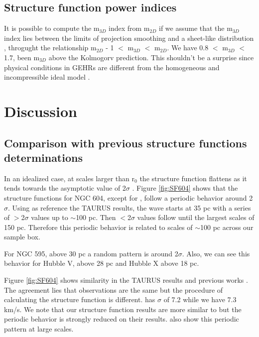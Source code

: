 \documentclass[fleqn,usenatbib]{mnras}
\begin{document}
\subsection{Structure function power indices}

It is possible to compute the m$_{3D}$ index from m$_{2D}$ if we assume that the m$_{3D}$ index lies between the limits of projection smoothing and a sheet-like distribution \citep{arthur2016turbulence}, throgught the relationship  m$_{2D}$ - 1 $<$ m$_{3D}$ $<$ m$_{2D}$. We have 0.8 $<$ m$_{3D}$ $<$ 1.7, been m$_{3D}$ above the Kolmogorv prediction. This shouldn't be a surprise since physical conditions in GEHRs are different from the homogeneous and incompressible ideal model \citep{munch1958internal, castaneda1988,lagrois2011}. 

\clearpage


\section{Discussion}\label{sec:disc}




\subsection{Comparison with previous structure functions determinations}

In an idealized case, at scales larger than r$_{0}$ the structure function flattens as it tends towards the asymptotic value of 2$\sigma$ \citep{arthur2016turbulence}. Figure \ref{fig:SF604} shows that the structure functions for NGC 604, except for \cite{2019arXiv191203543M}, follow a periodic behavior around 2$\sigma$. Using as reference the TAURUS results, the wave starts at 35 pc with a series of $ >$2$\sigma$ values up to $\sim$100 pc. Then $<$2$\sigma$ values follow until the largest scales of 150 pc. Therefore this periodic behavior is related to scales of $\sim$100 pc across our sample box. 

For NGC 595, above 30 pc a random pattern is around 2$\sigma$. Also, we can see this behavior for Hubble V, above 28 pc and Hubble X above 18 pc.

Figure \ref{fig:SF604} shows similarity in the TAURUS results and previous works \citep{tanco1997,2019arXiv191203543M}. The agreement lies that observations are the same but the procedure of calculating the structure function is different. \citep{2019arXiv191203543M} has $\sigma$ of 7.2 while we have 7.3 km/s. We note that our structure function results are more similar to \cite{2019arXiv191203543M} but the periodic behavior is strongly reduced on their results. \citep{tanco1997} also show this periodic pattern at large scales.
\end{document}
